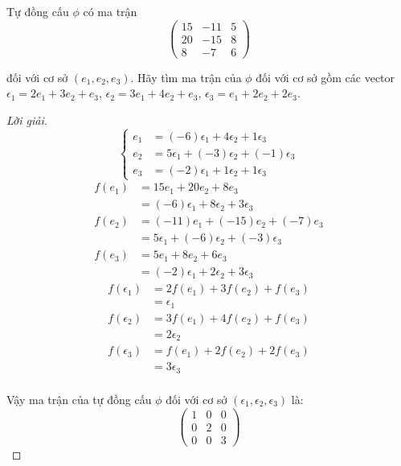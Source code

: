 \documentclass[class=linearalgebra,crop=false]{standalone}
\begin{document}
\begin{exercise}
    Tự đồng cấu $\phi$ có ma trận
    \[
        \begin{pmatrix}
            15 & -11 & 5 \\
            20 & -15 & 8 \\
            8  & -7  & 6
        \end{pmatrix}
    \]
    \par đối với cơ sở $(e_{1}, e_{2}, e_{3})$. Hãy tìm ma trận của $\phi$ đối với cơ sở gồm các vector $\epsilon_{1} = 2e_{1} + 3e_{2} + e_{3}$, $\epsilon_{2} = 3e_{1} + 4e_{2} + e_{3}$, $\epsilon_{3} = e_{1} + 2e_{2} + 2e_{3}$.
\end{exercise}

\begin{proof}[Lời giải]
    \[
        \begin{cases}
            e_{1} & = (-6)\epsilon_{1} + 4\epsilon_{2} + 1\epsilon_{3}    \\
            e_{2} & = 5\epsilon_{1} + (-3)\epsilon_{2} + (-1)\epsilon_{3} \\
            e_{3} & = (-2)\epsilon_{1} + 1\epsilon_{2} + 1\epsilon_{3}
        \end{cases}
    \]
    \begin{align*}
        f(e_{1}) & = 15e_{1} + 20e_{2} + 8e_{3}                          \\
                 & = (-6)\epsilon_{1} + 8\epsilon_{2} + 3\epsilon_{3}    \\
        f(e_{2}) & = (-11)e_{1} + (-15)e_{2} + (-7)e_{3}                 \\
                 & = 5\epsilon_{1} + (-6)\epsilon_{2} + (-3)\epsilon_{3} \\
        f(e_{3}) & = 5e_{1} + 8e_{2} + 6e_{3}                            \\
                 & = (-2)\epsilon_{1} + 2\epsilon_{2} + 3\epsilon_{3}
    \end{align*}
    \begin{align*}
        f(\epsilon_{1}) & = 2f(e_{1}) + 3f(e_{2}) + f(e_{3}) \\
                        & = \epsilon_{1}                     \\
        f(\epsilon_{2}) & = 3f(e_{1}) + 4f(e_{2}) + f(e_{3}) \\
                        & = 2\epsilon_{2}                    \\
        f(\epsilon_{3}) & = f(e_{1}) + 2f(e_{2}) + 2f(e_{3}) \\
                        & = 3\epsilon_{3}                    \\
    \end{align*}
    \par Vậy ma trận của tự đồng cấu $\phi$ đối với cơ sở $(\epsilon_{1}, \epsilon_{2}, \epsilon_{3})$ là:
    \[
        \begin{pmatrix}
            1 & 0 & 0 \\
            0 & 2 & 0 \\
            0 & 0 & 3
        \end{pmatrix}
    \]
\end{proof}
\end{document}

